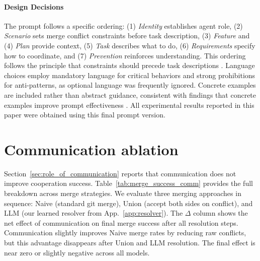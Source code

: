 \paragraph{Design Decisions} The prompt follows a specific ordering: (1) \textit{Identity} establishes agent role, (2) \textit{Scenario} sets merge conflict constraints before task description, (3) \textit{Feature} and (4) \textit{Plan} provide context, (5) \textit{Task} describes what to do, (6) \textit{Requirements} specify how to coordinate, and (7) \textit{Prevention} reinforces understanding. 
This ordering follows the principle that constraints should precede task descriptions \citep{sahoo2024systematic}. Language choices employ mandatory language for critical behaviors and strong prohibitions for anti-patterns, as optional language was frequently ignored. Concrete examples are included rather than abstract guidance, consistent with findings that concrete examples improve prompt effectiveness \citep{wei2022chain}. 
All experimental results reported in this paper were obtained using this final prompt version.







\section{Communication ablation}\label{app:comm_ablation}


Section~\ref{sec:role_of_communication} reports that communication does not improve cooperation success. Table~\ref{tab:merge_success_comm} provides the full breakdown across merge strategies. We evaluate three merging approaches in sequence: Naive (standard git merge), Union (accept both sides on conflict), and LLM (our learned resolver from App.~\ref{app:resolver}). The $\Delta$ column shows the net effect of communication on final merge success after all resolution steps. Communication slightly improves Naive merge rates by reducing raw conflicts, but this advantage disappears after Union and LLM resolution. The final effect is near zero or slightly negative across all models.


\newcommand{\posdelta}[1]{{\scriptsize\textcolor{green!60!black}{#1}}}
\newcommand{\negdelta}[1]{{\scriptsize\textcolor{red!70!black}{#1}}}
\newcommand{\posd}[1]{$_{\text{\scriptsize\textcolor{green!60!black}{+#1}}}$}
\newcommand{\negd}[1]{$_{\text{\scriptsize\textcolor{red!70!black}{#1}}}$}
\newcommand{\zerod}{$_{\text{\scriptsize\textcolor{gray}{0.0}}}$}

